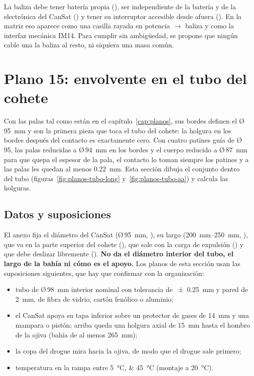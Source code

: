 \begin{nota}
La baliza debe tener batería propia (), ser independiente de la batería y de la
electrónica del CanSat () y tener su interruptor accesible desde afuera
(). En la matriz eso aparece como una casilla rayada en potencia $\to$ baliza y
como la interfaz mecánica IM14. Para cumplir  sin ambigüedad, se propone que
ningún cable una la baliza al resto, ni siquiera una masa común.
\end{nota}

\section{Plano 15: envolvente en el tubo del cohete}\label{sec:planos-tubo}

Con las palas tal como están en el capítulo~\ref{cap:planos}, sus bordes definen el
Ø\,\SI{95}{mm} y son la primera pieza que toca el tubo del cohete: la holgura en los bordes
después del contacto es exactamente cero. Con cuatro patines guía de Ø\,95, las palas
reducidas a Ø\,\SI{94}{mm} en los bordes y el cuerpo reducido a Ø\,\SI{87}{mm} para que
quepa el espesor de la pala, el contacto lo toman siempre los patines y a las palas les
quedan al menos \SI{0.22}{mm}. Esta sección dibuja el conjunto dentro del tubo
(figuras~\ref{fig:planos-tubo-long} y~\ref{fig:planos-tubo-aa}) y calcula las holguras.

\subsection{Datos y suposiciones}

El anexo fija el diámetro del CanSat (Ø\,\SI{95}{mm}, ), su largo
(\SIrange{200}{250}{mm}, ), que va en la parte superior del cohete (),
que sale con la carga de expulsión () y que debe deslizar libremente ().
\textbf{No da el diámetro interior del tubo, el largo de la bahía ni cómo es el
apoyo.} Los planos de esta sección usan las suposiciones siguientes, que hay que
confirmar con la organización:

\begin{itemize}[leftmargin=*]
  \item tubo de Ø\,\SI{98}{mm} interior nominal con tolerancia de \SI{\pm0.25}{mm} y pared
        de \SI{2}{mm}, de fibra de vidrio, cartón fenólico o aluminio;
  \item el CanSat apoya su tapa inferior sobre un protector de gases de \SI{14}{mm} y una
        mampara o pistón; arriba queda una holgura axial de \SI{15}{mm} hasta el hombro de
        la ojiva (bahía de al menos \SI{265}{mm});
  \item la copa del drogue mira hacia la ojiva, de modo que el drogue sale primero;
  \item temperatura en la rampa entre \SIlist{5;45}{\degreeCelsius} (montaje a
        \SI{20}{\degreeCelsius}).
\end{itemize}

